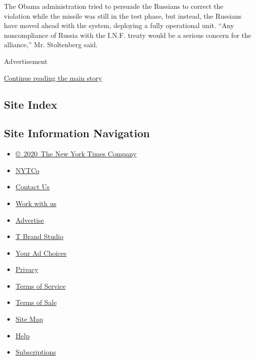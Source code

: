 The Obama administration tried to persuade the Russians to correct the
violation while the missile was still in the test phase, but instead,
the Russians have moved ahead with the system, deploying a fully
operational unit. ``Any noncompliance of Russia with the I.N.F. treaty
would be a serious concern for the alliance,'' Mr. Stoltenberg said.

Advertisement

\protect\hyperlink{after-bottom}{Continue reading the main story}

\hypertarget{site-index}{%
\subsection{Site Index}\label{site-index}}

\hypertarget{site-information-navigation}{%
\subsection{Site Information
Navigation}\label{site-information-navigation}}

\begin{itemize}
\tightlist
\item
  \href{https://help.nytimes.com/hc/en-us/articles/115014792127-Copyright-notice}{©~2020~The
  New York Times Company}
\end{itemize}

\begin{itemize}
\tightlist
\item
  \href{https://www.nytco.com/}{NYTCo}
\item
  \href{https://help.nytimes.com/hc/en-us/articles/115015385887-Contact-Us}{Contact
  Us}
\item
  \href{https://www.nytco.com/careers/}{Work with us}
\item
  \href{https://nytmediakit.com/}{Advertise}
\item
  \href{http://www.tbrandstudio.com/}{T Brand Studio}
\item
  \href{https://www.nytimes.com/privacy/cookie-policy\#how-do-i-manage-trackers}{Your
  Ad Choices}
\item
  \href{https://www.nytimes.com/privacy}{Privacy}
\item
  \href{https://help.nytimes.com/hc/en-us/articles/115014893428-Terms-of-service}{Terms
  of Service}
\item
  \href{https://help.nytimes.com/hc/en-us/articles/115014893968-Terms-of-sale}{Terms
  of Sale}
\item
  \href{https://spiderbites.nytimes.com}{Site Map}
\item
  \href{https://help.nytimes.com/hc/en-us}{Help}
\item
  \href{https://www.nytimes.com/subscription?campaignId=37WXW}{Subscriptions}
\end{itemize}
